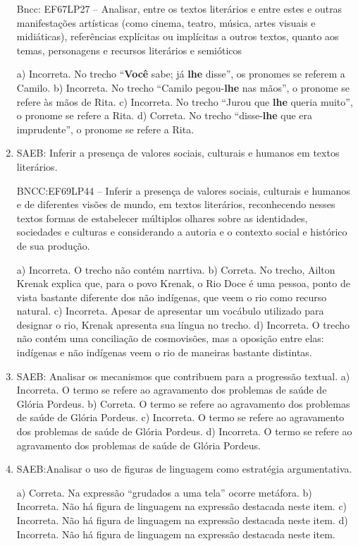 \begin{enumerate}
Bncc: EF67LP27 -- Analisar, entre os textos literários e entre estes e
outras manifestações artísticas (como cinema, teatro, música, artes
visuais e midiáticas), referências explícitas ou implícitas a outros
textos, quanto aos temas, personagens e recursos literários e semióticos

a) Incorreta. No trecho ``\textbf{Você} sabe; já \textbf{lhe} disse'', os pronomes se referem a Camilo.
b) Incorreta. No trecho ``Camilo pegou-\textbf{lhe} nas mãos'', o pronome se refere às mãos de Rita.
c) Incorreta. No trecho ``Jurou que \textbf{lhe} queria muito'', o pronome se refere a Rita.
d) Correta. No trecho ``disse-\textbf{lhe} que era imprudente'', o pronome se refere a Rita.

\item
SAEB: Inferir a presença de valores sociais, culturais e humanos em
textos literários.

BNCC:EF69LP44 -- Inferir a presença de valores sociais, culturais e
humanos e de diferentes visões de mundo, em textos literários,
reconhecendo nesses textos formas de estabelecer múltiplos olhares sobre
as identidades, sociedades e culturas e considerando a autoria e o
contexto social e histórico de sua produção.
 
a) Incorreta. O trecho não contém narrtiva.
b) Correta. No trecho, Ailton Krenak explica que, para o povo Krenak, o 
Rio Doce é uma pessoa, ponto de vista bastante diferente dos não indígenas,
que veem o rio como recurso natural. 
c) Incorreta. Apesar de apresentar um vocábulo utilizado para designar o rio, 
Krenak apresenta sua língua no trecho. 
d) Incorreta. O trecho não contém uma conciliação de cosmovisões, mas a
oposição entre elas: indígenas e não indígenas veem o rio de maneiras 
bastante distintas.

\item
SAEB: Analisar os mecanismos que contribuem para a progressão textual.
a) Incorreta. O termo se refere ao agravamento dos problemas de saúde de 
Glória Pordeus. 
b) Correta. O termo se refere ao agravamento dos problemas de saúde de 
Glória Pordeus. 
c) Incorreta. O termo se refere ao agravamento dos problemas de saúde de 
Glória Pordeus. 
d) Incorreta. O termo se refere ao agravamento dos problemas de saúde de 
Glória Pordeus.

\item
SAEB:Analisar o uso de figuras de linguagem como estratégia
argumentativa.

a) Correta. Na expressão ``grudados a uma tela'' ocorre metáfora.
b) Incorreta. Não há figura de linguagem na expressão destacada neste item.
c) Incorreta. Não há figura de linguagem na expressão destacada neste item.
d) Incorreta. Não há figura de linguagem na expressão destacada neste item.


\end{enumerate}

